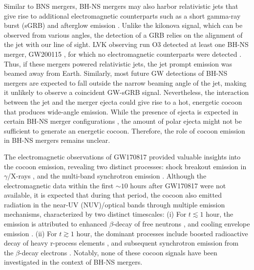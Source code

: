 \documentclass[twocolumn,dvipsnames]{aastex62}
\begin{document}
Similar to BNS mergers, BH-NS mergers may also harbor relativistic jets that give rise to additional electromagnetic counterparts such as a short gamma-ray burst (sGRB) and afterglow emission \citep{Paczynski1991,Mochkovitch1993,Janka1999,Etienne2012,Kiuchi2015,Paschalidis2015,Ruiz2018,Hayashi2022a,Hayashi2022b}. Unlike the kilonova signal, which can be observed from various angles, the detection of a GRB relies on the alignment of the jet with our line of sight. LVK observing run O3 detected at least one BH-NS merger, GW200115 \citep[with GW200105 being an additional controversional source;][]{Abbott2021}, for which no electromagnetic counterparts were detected \citep{Dichiara2021,Zhu2021}. Thus, if these mergers powered relativistic jets, the jet prompt emission was beamed away from Earth. Similarly, most future GW detections of BH-NS mergers are expected to fall outside the narrow beaming angle of the jet, making it unlikely to observe a coincident GW-sGRB signal. Nevertheless, the interaction between the jet and the merger ejecta could give rise to a hot, energetic cocoon that produces wide-angle emission. While the presence of ejecta is expected in certain BH-NS merger configurations \citep{Shibata2006,Shibata2007,Shibata2008,Shibata2011,Etienne2008,Rantsiou2008,Duez2010,Foucart2012a,Foucart2011,Foucart2012b,Foucart2014,Foucart2017,Foucart2019,Kyutoku2011,Kyutoku2013,Kawaguchi2015,Kyutoku2015,Hayashi2021}, the amount of polar ejecta might not be sufficient to generate an energetic cocoon. Therefore, the role of cocoon emission in BH-NS mergers remains unclear.

The electromagnetic observations of GW170817 provided valuable insights into the cocoon emission, revealing two distinct processes: shock breakout emission in $\gamma$/X-rays \citep{Kasliwal2017,Gottlieb2018b}, and the multi-band synchrotron emission \citep[e.g.,][]{Lazzati2018,Mooley2018a,Mooley2018b}. Although the electromagnetic data within the first $ \sim 10 $ hours after GW170817 were not available, it is expected that during that period, the cocoon also emitted radiation in the near-UV (NUV)/optical bands through multiple emission mechanisms, characterized by two distinct timescales:
(i) For $t \lesssim 1$ hour, the emission is attributed to enhanced $ \beta $-decay of free neutrons \citep{Gottlieb2020c}, and cooling envelope emission \citep[][]{Metzger2015,Kasliwal2017,Nakar2017,Gottlieb2018a,Piro2018}.
(ii) For $t \gtrsim 1$ hour, the dominant processes include boosted radioactive decay of heavy r-process elements \citep[kilonova;][]{Metzger2015,Kasliwal2017,Nakar2017,Gottlieb2018a,Piro2018,Hamidani2022}, and subsequent synchrotron emission from the $ \beta $-decay electrons \citep{Gottlieb2020c}.
Notably, none of these cocoon signals have been investigated in the context of BH-NS mergers.
\end{document}

